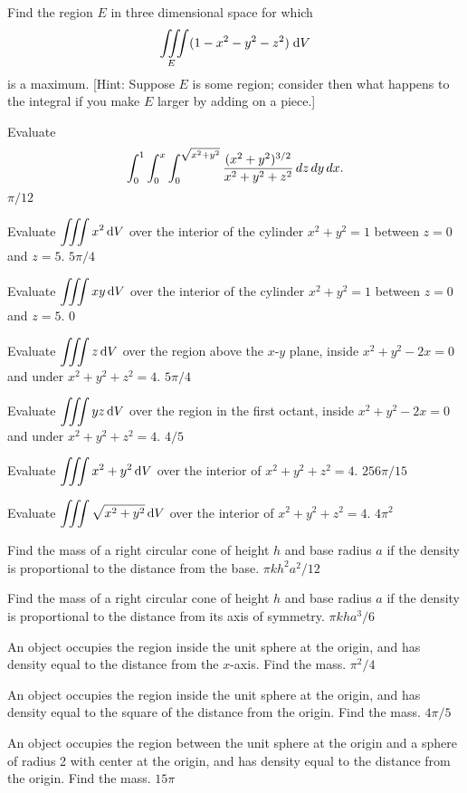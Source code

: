 \begin{multicols}{2}
\subprob Find the region $E$ in three dimensional space for which
\[
\displaystyle\iiint\limits_{E} (1-x^2-y^2-z^2) \; \mathrm{d} V
\]
is a maximum.  [Hint: Suppose $E$ is some region; consider then 
what happens to the integral if you make $E$ larger by adding on a
piece.]






\problem Evaluate
\[
\int_{0}^{1}\int_{0}^{x}\int_{0}^{\sqrt{x^2+y^2}} 
{(x^2+y^2)^{3/2}\over x^2+y^2+z^2}\,dz\,dy\,dx.  
\]
\answer
$\pi/12$
\endanswer

\problem Evaluate $\displaystyle\iiint x^2\,\mathrm{d} V $ 
over the interior of the cylinder $x^2+y^2=1$ between $z=0$ and $z=5$.
\answer
$5\pi/4$
\endanswer

\problem Evaluate $\displaystyle\iiint xy\,\mathrm{d} V $ 
over the interior of the cylinder $x^2+y^2=1$ between $z=0$ and $z=5$.
\answer
$0$
\endanswer

\problem Evaluate $\displaystyle\iiint z\,\mathrm{d} V $ 
over the region above the $x$-$y$ plane, inside $x^2+y^2-2x=0$ and
under $x^2+y^2+z^2=4$.
\answer
$5\pi/4$
\endanswer

\problem Evaluate $\displaystyle\iiint yz\,\mathrm{d} V $ 
over the region in the first octant, inside $x^2+y^2-2x=0$ and 
under $x^2+y^2+z^2=4$.
\answer
$4/5$
\endanswer

\problem Evaluate $\displaystyle\iiint x^2+y^2\,\mathrm{d} V $ 
over the interior of $x^2+y^2+z^2=4$.
\answer
$256\pi/15$
\endanswer

\problem Evaluate $\displaystyle\iiint \sqrt{x^2+y^2}\,\mathrm{d} V $ 
over the interior of $x^2+y^2+z^2=4$.
\answer
$4\pi^2$
\endanswer

\problem Find the mass of a right circular cone of height $h$ and 
base radius $a$ if the density is proportional to the distance from
the base.
\answer
$\pi kh^2a^2/12$
\endanswer

\problem Find the mass of a right circular cone of height $h$ and 
base radius $a$ if the density is proportional to the distance from
its axis of symmetry.
\answer
$\pi kha^3/6$
\endanswer

\problem An object occupies the region inside the unit sphere at the 
origin, and has density equal to the distance from the $x$-axis. Find
the mass.
\answer
$\pi^2/4$
\endanswer

\problem An object occupies the region inside the unit sphere at the 
origin, and has density equal to the square of the distance from the
origin. Find the mass.
\answer
$4\pi/5$
\endanswer

\problem An object occupies the region between the unit sphere at the 
origin and a sphere of radius 2 with center at the origin, and has
density equal to the distance from the origin. Find the mass.
\answer
$15\pi$
\endanswer





\end{multicols}
\noproblemfont


